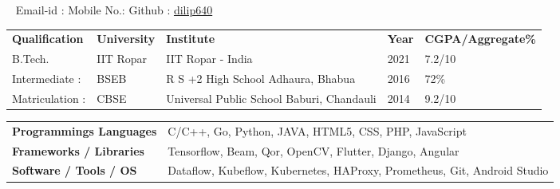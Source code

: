\documentclass[a4paper,12pt]{awesome}
\newcommand{\psep}{-0.6cm}
\begin{document}
\ \linebreak
{} \hfill Email-id :  \linebreak
{} \hfill Mobile No.:  \linebreak
{} \hfill Github : \href{https://github.com/dilip640}{dilip640}
\linebreak \linebreak
{}

\begin{tabular}{ l @{\hskip 0.12in} l @{\hskip 0.12in} l @{\hskip 0.12in} l @{\hskip 0.12in} l }

\textbf{Qualification} & \textbf{University} & \textbf{Institute} & \textbf{Year} & \textbf{CGPA/Aggregate\%} \\

B.Tech.& IIT Ropar & IIT Ropar  - India & 2021 & 7.2/10 \\
Intermediate :& BSEB & R S +2 High School Adhaura, Bhabua & 2016  &  72\% \\
Matriculation :& CBSE & Universal Public School Baburi, Chandauli  & 2014& 9.2/10 \\
\end{tabular} \linebreak
{}\linebreak
\indent 
\begin{tabular}{ l @{\hskip 0.006cm} l }
    \textbf{Programmings Languages } & C/C++, Go, Python, JAVA, HTML5, CSS, PHP, JavaScript \\
    \textbf{Frameworks / Libraries} & Tensorflow, Beam, Qor, OpenCV, Flutter, Django, Angular \\ 
    \textbf{Software / Tools / OS} & Dataflow, Kubeflow, Kubernetes, HAProxy, Prometheus, Git, Android Studio  \\
\end{tabular}\\
\linebreak
{}\\[\psep]
\end{document}
